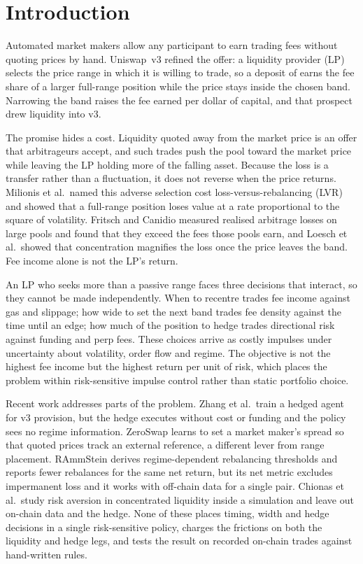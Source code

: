 \section{Introduction}
\label{sec:intro}

Automated market makers allow any participant to earn trading fees without
quoting prices by hand. Uniswap~v3 refined the offer: a liquidity provider (LP)
selects the price range in which it is willing to trade, so a deposit of
 earns the fee share of a larger full-range position while the
price stays inside the chosen band\cite{adams2021uniswap}. Narrowing the band
raises the fee earned per dollar of capital, and that prospect drew liquidity
into v3.

The promise hides a cost. Liquidity quoted away from the market price is an
offer that arbitrageurs accept, and such trades push the pool toward the market
price while leaving the LP holding more of the falling asset. Because the loss
is a transfer rather than a fluctuation, it does not reverse when the price
returns. Milionis et al.\ named this adverse selection cost
loss-versus-rebalancing (LVR) and showed that a full-range position loses value
at a rate proportional to the square of volatility\cite{milionis2022lvr}.
Fritsch and Canidio measured realised arbitrage losses on large pools and found
that they exceed the fees those pools earn\cite{fritsch2024measuring}, and
Loesch et al.\ showed that concentration magnifies the loss once the price
leaves the band\cite{loesch2021impermanent}. Fee income alone is not the LP's
return.

An LP who seeks more than a passive range faces three decisions that interact,
so they cannot be made independently. When to recentre trades fee income against
gas and slippage; how wide to set the next band trades fee density against the
time until an edge; how much of the position to hedge trades directional risk
against funding and perp fees. These choices arrive as costly impulses under
uncertainty about volatility, order flow and regime. The objective is not the
highest fee income but the highest return per unit of risk, which places the
problem within risk-sensitive impulse control rather than static portfolio
choice\cite{anchuri2026rammstein}.

Recent work addresses parts of the problem. Zhang et al.\ train a hedged agent
for v3 provision, but the hedge executes without cost or funding and the policy
sees no regime information\cite{zhang2023adaptive}. ZeroSwap learns to set a
market maker's spread so that quoted prices track an external reference, a
different lever from range placement\cite{nadkarni2023zeroswap}. RAmmStein
derives regime-dependent rebalancing thresholds and reports fewer rebalances
for the same net return, but its net metric excludes impermanent loss and it
works with off-chain data for a single pair\cite{anchuri2026rammstein}. Chionas
et al.\ study risk aversion in concentrated liquidity inside a simulation and
leave out on-chain data and the hedge\cite{chionas2026concentrated}. None of
these places timing, width and hedge decisions in a single risk-sensitive
policy, charges the frictions on both the liquidity and hedge legs, and tests
the result on recorded on-chain trades against hand-written rules.

